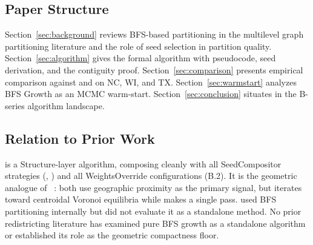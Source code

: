 \subsection{Paper Structure}

Section~\ref{sec:background} reviews BFS-based partitioning in the
multilevel graph partitioning literature and the role of seed selection
in partition quality.
Section~\ref{sec:algorithm} gives the formal \bfsg{} algorithm with
pseudocode, seed derivation, and the contiguity proof.
Section~\ref{sec:comparison} presents empirical comparison against \metis{}
and \cvd{} on NC, WI, and TX.
Section~\ref{sec:warmstart} analyzes BFS Growth as an MCMC warm-start.
Section~\ref{sec:conclusion} situates \bfsg{} in the B-series algorithm
landscape.

\subsection{Relation to Prior Work}

\bfsg{} is a Structure-layer algorithm, composing cleanly with all
SeedCompositor strategies (\cs{}, \be{}) and all WeightsOverride
configurations (B.2).
It is the geometric analogue of \cvd{}~\citep{b22paper}: both use
geographic proximity as the primary signal, but \cvd{} iterates toward
centroidal Voronoi equilibria while \bfsg{} makes a single pass.
\citet{karypis1998} used BFS partitioning internally but did not
evaluate it as a standalone method.
No prior redistricting literature has examined pure BFS growth as a
standalone algorithm or established its role as the geometric
compactness floor.

